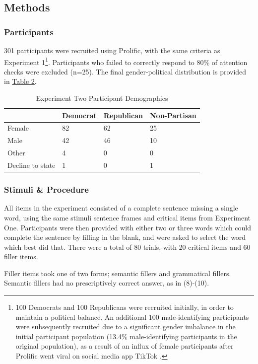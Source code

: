 \documentclass[10pt,letterpaper]{article}
\begin{document}
	\subsection{Methods}
	\subsubsection{Participants} 301 participants were recruited using Prolific, with the same criteria as Experiment 1\footnote{100 Democrats and 100 Republicans were recruited initially, in order to maintain a political balance. An additional 100 male-identifying participants were subsequently recruited due to a significant gender imbalance in the initial participant population (13.4\% male-identifying participants in the original population), as a result of an influx of female participants after Prolific went viral on social media app TikTok \parencite{charalambides2021}.}. Participants who failed to correctly respond to 80\% of attention checks were excluded (n=25). The final gender-political distribution is provided in \hyperref[exp2-sample-table]{Table 2}.\par

	\begin{table}[!ht]
		\begin{center} 
			\caption{Experiment Two Participant Demographics} 
			\label{exp2-sample-table} 
			\vskip 0.12in
			\begin{tabular}{llll} 
				\hline
				&  Democrat & Republican & Non-Partisan \\
				\hline
				Female &  82 & 62 & 25 \\
				Male & 42 & 46 & 10 \\
				Other & 4 & 0 & 0 \\
				Decline to state & 1 & 0 & 1 \\
				\hline
			\end{tabular} 
		\end{center} 
	\end{table}
	
	\subsubsection{Stimuli \& Procedure} All items in the experiment consisted of a complete sentence missing a single word, using the same stimuli sentence frames and critical items from Experiment One. Participants were then provided with either two or three words which could complete the sentence by filling in the blank, and were asked to select the word which best did that. There were a total of 80 trials, with 20 critical items and 60 filler items.\par 
	Filler items took one of two forms; semantic fillers and grammatical fillers. Semantic fillers had no prescriptively correct answer, as in (8)-(10).
	
\end{document}
